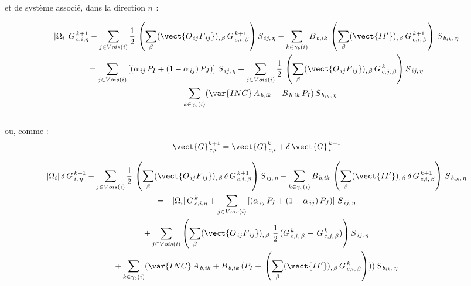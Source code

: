 et de syst\`eme associ\'e, dans la direction $\eta$~:

\begin{multline}\label{Base_Gradrc_eq_reconstruction_comp2}
|\Omega_i|\,{G}^{\,k+1}_{\,c,i,\eta} -
\sum\limits_{j\in Vois(i)}\frac{1}{2}\,\left(\sum\limits_{\beta}(\vect{O_{\,ij}F_{\,ij}})_{,\,\beta}\,{G}^{\,k+1}_{\,c,i,\,\beta}\right){S}_{\,ij,\,\eta}
-\sum\limits_{k\in {\gamma_b(i)}} B_{\,b,ik}\,\left(\sum\limits_{\beta}(\vect{II'})_{,\,\beta}\,{G}^{\,k+1}_{\,c,i,\,\beta}\right)\,{S}_{\,b_{ik},\,\eta}\\
= \sum\limits_{j\in Vois(i)}\left[
(\alpha_{\,ij}\,P_I + (1 - \alpha_{\,ij})\,P_J)\right]\,{{S}_{\,ij,\,\eta}}
+\sum\limits_{j\in Vois(i)}\frac{1}{2}\,\left(\sum\limits_{\beta}(\vect{O_{\,ij}F_{\,ij}})_{,\,\beta}\,{G}^{\,k}_{\,c,j,\,\beta}\right){S}_{\,ij,\,\eta}\\
+\sum\limits_{k\in {\gamma_b(i)}}(\var{INC}\,A_{\,b,ik} + B_{\,b,ik}\,P_{I})\,{S}_{\,{b}_{ik},\,\eta}
\end{multline}\\
ou, comme :
\begin{equation}\notag
 \vect{G}^{k+1}_{\,c,i}= \vect{G}^k_{\,c,i}+ \delta\,\vect{G}^{\,k+1}_{\,i}
\end{equation}

\begin{multline}\label{Base_Gradrc_eq_reconstruction_increment}
|\Omega_i|\,{\delta\,G}^{\,k+1}_{\,i,\,\eta} -
\sum\limits_{j\in Vois(i)}\frac{1}{2}\,\left(\sum\limits_{\beta}(\vect{O_{\,ij}F_{\,ij}})_{,\,\beta}\,{\delta\,G}^{\,k+1}_{\,c,i,\,\beta}\right){S}_{\,ij,\,\eta}
-\sum\limits_{k\in {\gamma_b(i)}} B_{\,b,ik}\,\left(\sum\limits_{\beta}(\vect{II'})_{,\,\beta}\,{\delta\,G}^{\,k+1}_{\,c,i,\,\beta}\right)\,{S}_{\,b_{ik},\,\eta}\\
= -|\Omega_i|\,{G}^{\,k}_{\,c,i,\eta}
 + \sum\limits_{j\in Vois(i)}\left[
(\alpha_{\,ij}\,P_I + (1 - \alpha_{\,ij})\,P_J)\right]\,{{S}_{\,ij,\,\eta}}\\
+ \sum\limits_{j\in Vois(i)}\left(\sum\limits_{\beta}(\vect{O_{\,ij}F_{\,ij}})_{,\,\beta}\,\,\frac{1}{2}\,({G}^{\,k}_{\,c,i,\,\beta}+\,{G}^{\,k}_{\,c,j,\,\beta})\right){S}_{\,ij,\,\eta}\\
+\sum\limits_{k\in {\gamma_b(i)}}(\var{INC}\,A_{\,b,ik} +
B_{\,b,ik}\,(P_{I} + \,\left(\sum\limits_{\beta}(\vect{II'})_{,\,\beta}\,{G}^{\,k}_{\,c,i,\,\beta}\right)))\,{S}_{\,{b}_{ik},\,\eta}
\end{multline}\\


